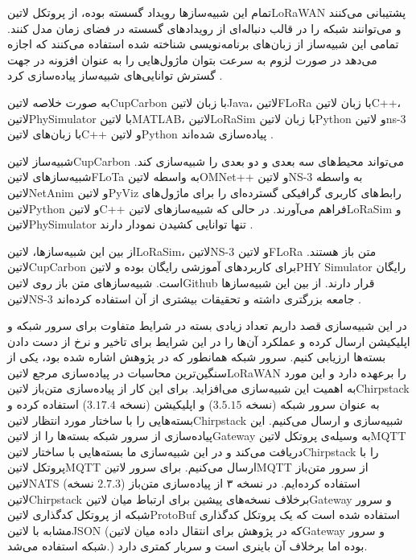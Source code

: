 تمام این شبیه‌سازها رویداد گسسته بوده، از پروتکل ‌لاتین{LoRaWAN} پشتیبانی می‌کنند و می‌توانند شبکه را در قالب
دنباله‌ای از رویدادهای گسسته در فضای زمان مدل کنند.
تمامی این شبیه‌ساز از زبان‌های برنامه‌نویسی شناخته شده استفاده می‌کنند که اجازه می‌دهد در صورت لزوم به سرعت بتوان
ماژول‌هایی را به عنوان افزونه در جهت گسترش توانایی‌های شبیه‌ساز پیاده‌سازی کرد
.

به صورت خلاصه ‌لاتین{CupCarbon} با زبان ‌لاتین{Java}، ‌لاتین{FLoRa} با زبان ‌لاتین{C++}،
‌لاتین{PhySimulator} با ‌لاتین{MATLAB}، ‌لاتین{LoRaSim} با زبان ‌لاتین{Python}
و ‌لاتین{ns-3} با زبان‌های ‌لاتین{C++} و ‌لاتین{Python} پیاده‌سازی شده‌اند
.

شبیه‌ساز ‌لاتین{CupCarbon} می‌تواند محیط‌های سه بعدی و دو بعدی را شبیه‌سازی کند.
شبیه‌سازهای ‌لاتین{FLoTa} به واسطه ‌لاتین{OMNet++} و ‌لاتین{NS-3} به واسطه
‌لاتین{NetAnim} و ‌لاتین{PyViz} رابط‌های کاربری گرافیکی گسترده‌ای را برای ماژول‌های ‌لاتین{Python}
و ‌لاتین{C++} فراهم می‌آورند.
در حالی که شبیه‌سازهای ‌لاتین{LoRaSim} و ‌لاتین{PhySimulator} تنها توانایی کشیدن نمودار دارند
.

از بین این شبیه‌سازها، ‌لاتین{LoRaSim}، ‌لاتین{NS-3} و ‌لاتین{FLoRa} متن باز هستند.
‌لاتین{CupCarbon} برای کاربردهای آموزشی رایگان بوده و ‌لاتین{PHY Simulator} رایگان است.
شبیه‌سازهای متن‌ باز روی ‌لاتین{Github} قرار دارند. از بین این شبیه‌سازها ‌لاتین{NS-3}
جامعه بزرگتری داشته و تحقیقات بیشتری از آن استفاده کرده‌اند
.


در این شبیه‌سازی قصد داریم تعداد زیادی بسته در شرایط متفاوت برای سرور شبکه و اپلیکیشن ارسال کرده و عملکرد آن‌ها را در این شرایط برای تاخیر و نرخ از دست دادن بسته‌ها ارزیابی کنیم.
سرور شبکه همانطور که در پژوهش  اشاره شده بود، یکی از سنگین‌ترین محاسبات در پیاده‌سازی مرجع ‌لاتین{LoRaWAN} را برعهده دارد و این مورد به
اهمیت این شبیه‌سازی می‌افزاید.
برای این کار از پیاده‌سازی متن‌باز ‌لاتین{Chirpstack} به عنوان سرور شبکه (نسخه $3.5.15$) و اپلیکیشن (نسخه $3.17.4$) استفاده کرده و بسته‌هایی را با ساختار مورد انتظار
‌لاتین{Chirpstack} شبیه‌سازی و ارسال می‌کنیم.
این پیاده‌سازی از سرور شبکه بسته‌ها را از ‌لاتین{Gateway} به وسیله‌ی پروتکل ‌لاتین{MQTT} دریافت می‌کند و در این شبیه‌سازی ما بسته‌هایی با ساختار ‌لاتین{Chirpstack}
را با پروتکل ‌لاتین{MQTT} ارسال می‌کنیم. برای سرور ‌لاتین{MQTT} از سرور متن‌باز ‌لاتین{NATS} (نسخه $2.7.3$) استفاده کرده‌ایم.
در نسخه ۳ از پیاده‌سازی متن‌باز ‌لاتین{Chirpstack} برخلاف نسخه‌های پیشین برای ارتباط میان ‌لاتین{Gateway} و سرور شبکه از پروتکل کدگذاری ‌لاتین{ProtoBuf} استفاده شده است که یک پروتکل
کدگذاری مشابه با ‌لاتین{JSON} (که در پژوهش  برای انتقال داده میان ‌لاتین{Gateway} و سرور شبکه استفاده می‌شد.) بوده اما برخلاف آن باینری است و سربار کمتری دارد.

